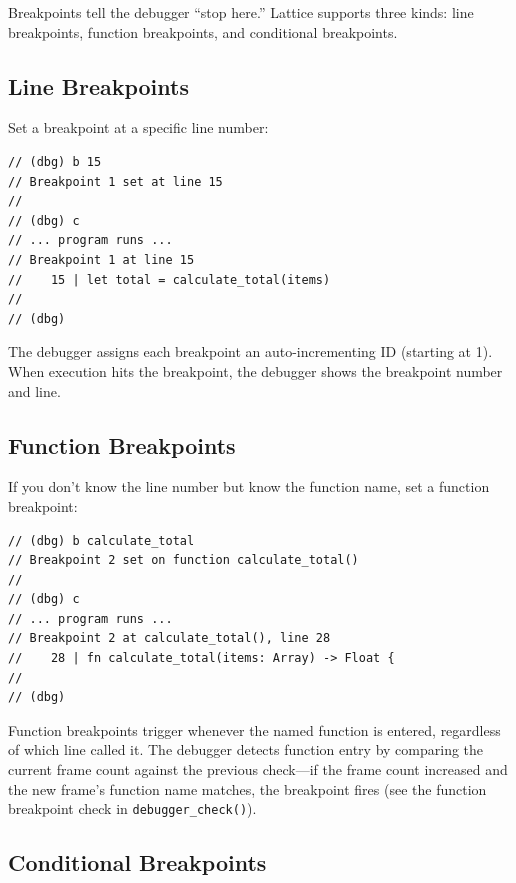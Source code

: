 Breakpoints tell the debugger ``stop here.''
Lattice supports three kinds: line breakpoints, function breakpoints, and conditional breakpoints.

\subsection{Line Breakpoints}\label{sec:bp-line}

Set a breakpoint at a specific line number:

\begin{lstlisting}[language=Lattice, caption={Setting a line breakpoint}]
// (dbg) b 15
// Breakpoint 1 set at line 15
//
// (dbg) c
// ... program runs ...
// Breakpoint 1 at line 15
//    15 | let total = calculate_total(items)
//
// (dbg)
\end{lstlisting}

The debugger assigns each breakpoint an auto-incrementing ID (starting at 1).
When execution hits the breakpoint, the debugger shows the breakpoint number and line.

\subsection{Function Breakpoints}\label{sec:bp-function}

If you don't know the line number but know the function name, set a function breakpoint:

\begin{lstlisting}[language=Lattice, caption={Setting a function breakpoint}]
// (dbg) b calculate_total
// Breakpoint 2 set on function calculate_total()
//
// (dbg) c
// ... program runs ...
// Breakpoint 2 at calculate_total(), line 28
//    28 | fn calculate_total(items: Array) -> Float {
//
// (dbg)
\end{lstlisting}

Function breakpoints trigger whenever the named function is entered, regardless of which line called it.
The debugger detects function entry by comparing the current frame count against the previous check---if the frame count increased and the new frame's function name matches, the breakpoint fires (see the function breakpoint check in \lstinline|debugger_check()|).

\subsection{Conditional Breakpoints}\label{sec:bp-conditional}

